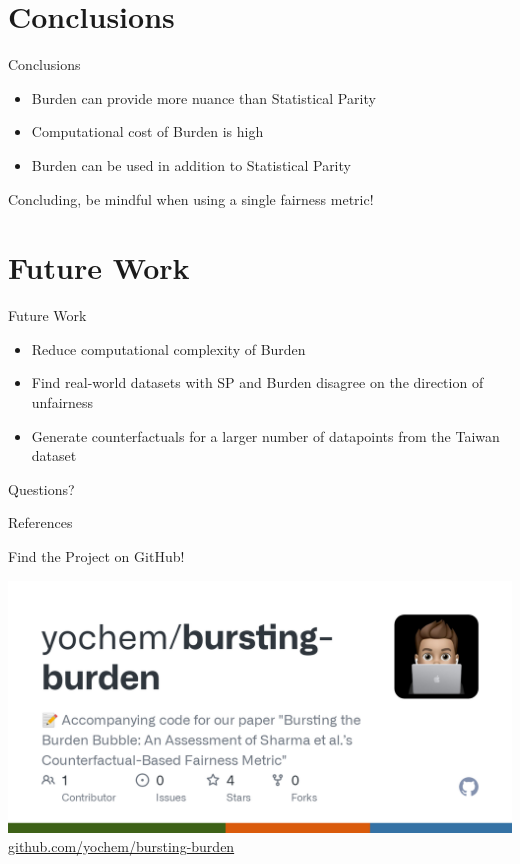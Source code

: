 \documentclass[aspectratio=169]{beamer}
\begin{document}
\section{Conclusions}

\begin{frame}{Conclusions}
    \begin{itemize}
        \item Burden can provide more nuance than Statistical Parity
        \item Computational cost of Burden is high
        \item Burden can be used in addition to Statistical Parity
    \end{itemize}

    \vspace{1cm}
    \begin{center}
    {\large\alert{Concluding, be mindful when using a single fairness metric!}}
    \end{center}
\end{frame}

\section{Future Work}
\begin{frame}{Future Work}
    \begin{itemize}
        \item Reduce computational complexity of Burden
        \item Find real-world datasets with SP and Burden disagree on the
            direction of unfairness
        \item Generate counterfactuals for a larger number of datapoints from
            the Taiwan dataset
    \end{itemize} 
\end{frame}

\appendix

\begin{frame}[standout]
  Questions?
\end{frame}

\begin{frame}[allowframebreaks]{References}

  
  

\end{frame}


\begin{frame}{Find the Project on GitHub!}

\begin{center}
    \includegraphics[width=.6\textwidth]{img/github.png}
    \vspace{1cm}
    \alert{
    \href{https://github.com/yochem/bursting-burden}{github.com/yochem/bursting-burden}
    }
\end{center}
\end{frame}
\end{document}
